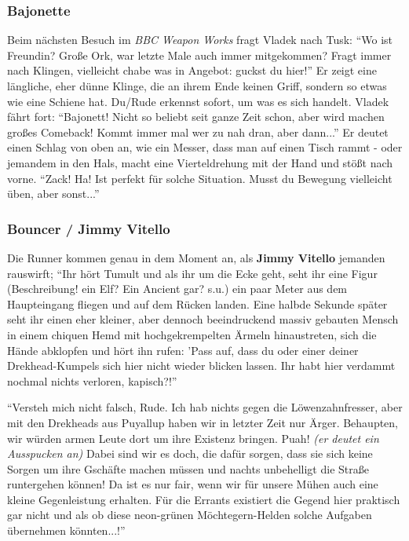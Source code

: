 \subsubsection{Bajonette}
Beim nächsten Besuch im \textit{BBC Weapon Works} fragt Vladek nach Tusk: ``Wo ist Freundin? Große Ork, war letzte Male auch immer mitgekommen? Fragt immer nach Klingen, vielleicht chabe was in Angebot: guckst du hier!'' Er zeigt eine längliche, eher dünne Klinge, die an ihrem Ende keinen Griff, sondern so etwas wie eine Schiene hat. Du/Rude erkennst sofort, um was es sich handelt. Vladek fährt fort: ``Bajonett! Nicht so beliebt seit ganze Zeit schon, aber wird machen großes Comeback! Kommt immer mal wer zu nah dran, aber dann...'' Er deutet einen Schlag von oben an, wie ein Messer, dass man auf einen Tisch rammt - oder jemandem in den Hals, macht eine Vierteldrehung mit der Hand und stößt nach vorne. ``Zack! Ha! Ist perfekt für solche Situation. Musst du Bewegung vielleicht üben, aber sonst...''

\subsubsection{Bouncer / Jimmy Vitello}
Die Runner kommen genau in dem Moment an, als \textbf{Jimmy Vitello} jemanden rauswirft; ``Ihr hört Tumult und als ihr um die Ecke geht, seht ihr eine Figur (Beschreibung! ein Elf? Ein Ancient gar? s.u.) ein paar Meter aus dem Haupteingang fliegen und auf dem Rücken landen. Eine halbde Sekunde später seht ihr einen eher kleiner, aber dennoch beeindruckend massiv gebauten Mensch in einem chiquen Hemd mit hochgekrempelten Ärmeln hinaustreten, sich die Hände abklopfen und hört ihn rufen: 'Pass auf, dass du oder einer deiner Drekhead-Kumpels sich hier nicht wieder blicken lassen. Ihr habt hier verdammt nochmal nichts verloren, kapisch?!''

\vspace{0.5em}
``Versteh mich nicht falsch, Rude. Ich hab nichts gegen die Löwenzahnfresser, aber mit den Drekheads aus Puyallup haben wir in letzter Zeit nur Ärger. Behaupten, wir würden armen Leute dort um ihre Existenz bringen. Puah! \textit{(er deutet ein Ausspucken an)} Dabei sind wir es doch, die dafür sorgen, dass sie sich keine Sorgen um ihre Gschäfte machen müssen und nachts unbehelligt die Straße runtergehen können! Da ist es nur fair, wenn wir für unsere Mühen auch eine kleine Gegenleistung erhalten. Für die Errants existiert die Gegend hier praktisch gar nicht und als ob diese neon-grünen Möchtegern-Helden solche Aufgaben übernehmen könnten...!''


